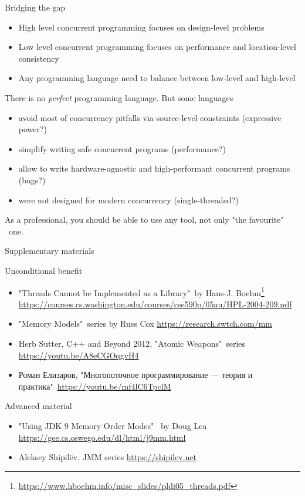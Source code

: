 \begin{frame}[t,noframenumbering]{Bridging the gap}

\begin{itemize}
  \item High level concurrent programming focuses on design-level problems
  \item Low level concurrent programming focuses on performance and location-level consistency
  \pause \item Any programming language need to balance between low-level and high-level
\end{itemize}

\pause

There is no \textit{perfect} programming language. \pause But some languages
\begin{itemize}
  \pause
  \item avoid most of concurrency pitfalls via source-level constraints \pause (expressive power?)
  \pause
  \item simplify writing safe concurrent programs \pause (performance?)
  \pause
  \item allow to write hardware-agnostic and high-performant concurrent programs \pause (bugs?)
  \pause
  \item were not designed for modern concurrency \pause (single-threaded?)
\end{itemize}

\pause

As a professional, you should be able to use any tool, not only "the favourite" \ one. 

\end{frame}


\begin{frame}{Supplementary materials}

Unconditional benefit
\begin{itemize}
  \item "Threads Cannot be Implemented as a Library"\ by Hans-J. Boehm\footnote{\tiny\url{https://www.hboehm.info/misc_slides/pldi05_threads.pdf}}
  \url{https://courses.cs.washington.edu/courses/cse590p/05au/HPL-2004-209.pdf}

  \item "Memory Models"\ series by Russ Cox \url{https://research.swtch.com/mm}
  \item Herb Sutter, C++ and Beyond 2012, "Atomic Weapons"\ series \url{https://youtu.be/A8eCGOqgvH4}    
  \item Роман Елизаров, "Многопоточное программирование — теория и практика"\ \url{https://youtu.be/mf4lC6TpclM}
\end{itemize}

Advanced material
\begin{itemize}
  \item "Using JDK 9 Memory Order Modes" \ by Doug Lea \url{https://gee.cs.oswego.edu/dl/html/j9mm.html}
  \item Aleksey Shipilëv, JMM series \url{https://shipilev.net}
\end{itemize}

\end{frame}


